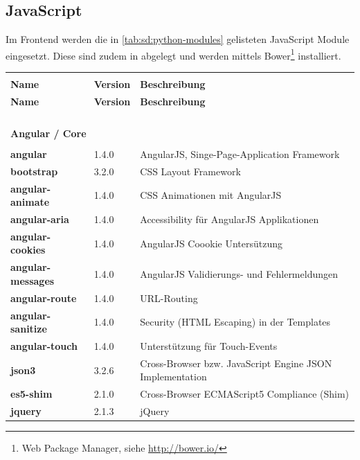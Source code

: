 \subsection{JavaScript}
Im Frontend werden die in \cref{tab:sd:python-modules} gelisteten JavaScript Module eingesetzt. Diese sind zudem in  abgelegt und werden mittels Bower\footnote{Web Package Manager, siehe \url{http://bower.io/}} installiert.

\begin{tabularx}{\textwidth}{llX}
  \toprule\\
  \textbf{Name} & \textbf{Version} & \textbf{Beschreibung} \\
  \endfirsthead

  \textbf{Name} & \textbf{Version} & \textbf{Beschreibung} \\
  \midrule\\
  \endhead

  \midrule\\
  \endfoot

  \bottomrule\\
  \caption{Benötigte JavaScript Module}
  \label{tab:sd:javascript-modules}
  \endlastfoot

  \midrule\\
  \multicolumn{3}{l}{\textbf{Angular / Core}}\\
  \midrule\\

  \textbf{angular} & 1.4.0 & AngularJS, Singe-Page-Application Framework\\
  \textbf{bootstrap} & 3.2.0 & CSS Layout Framework\\
  \textbf{angular-animate} & 1.4.0 & CSS Animationen mit AngularJS\\
  \textbf{angular-aria} & 1.4.0 & Accessibility für AngularJS Applikationen\\
  \textbf{angular-cookies} & 1.4.0 & AngularJS Coookie Untersützung\\
  \textbf{angular-messages} & 1.4.0 & AngularJS Validierungs- und Fehlermeldungen\\
  \textbf{angular-route} & 1.4.0 & URL-Routing\\
  \textbf{angular-sanitize} & 1.4.0 & Security (HTML Escaping) in der Templates\\
  \textbf{angular-touch} & 1.4.0 & Unterstützung für Touch-Events\\
  \textbf{json3} & 3.2.6 & Cross-Browser bzw. JavaScript Engine JSON Implementation\\
  \textbf{es5-shim} & 2.1.0 & Cross-Browser ECMAScript5 Compliance (Shim)\\
  \textbf{jquery} & 2.1.3 & jQuery\\


\end{tabularx}
